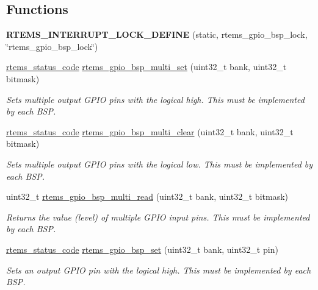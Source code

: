 \subsection*{Functions}
\begin{DoxyCompactItemize}
\item 
\mbox{\label{rpi-gpio_8c_a8cc4adc10f9d16b85b524f1ad1151929}} 
{\bfseries R\+T\+E\+M\+S\+\_\+\+I\+N\+T\+E\+R\+R\+U\+P\+T\+\_\+\+L\+O\+C\+K\+\_\+\+D\+E\+F\+I\+NE} (static, rtems\+\_\+gpio\+\_\+bsp\+\_\+lock, \char`\"{}rtems\+\_\+gpio\+\_\+bsp\+\_\+lock\char`\"{})
\item 
\mbox{\hyperlink{group__ClassicStatus_ga545d41846817eaba6143d52ee4d9e9fe}{rtems\+\_\+status\+\_\+code}} \mbox{\hyperlink{rpi-gpio_8c_a871540588ae2d984d118671860bb2cc1}{rtems\+\_\+gpio\+\_\+bsp\+\_\+multi\+\_\+set}} (uint32\+\_\+t bank, uint32\+\_\+t bitmask)
\begin{DoxyCompactList}\small\item\em Sets multiple output G\+P\+IO pins with the logical high. This must be implemented by each B\+SP. \end{DoxyCompactList}\item 
\mbox{\hyperlink{group__ClassicStatus_ga545d41846817eaba6143d52ee4d9e9fe}{rtems\+\_\+status\+\_\+code}} \mbox{\hyperlink{rpi-gpio_8c_afa7c04d98a3c71b972a41697e1842863}{rtems\+\_\+gpio\+\_\+bsp\+\_\+multi\+\_\+clear}} (uint32\+\_\+t bank, uint32\+\_\+t bitmask)
\begin{DoxyCompactList}\small\item\em Sets multiple output G\+P\+IO pins with the logical low. This must be implemented by each B\+SP. \end{DoxyCompactList}\item 
uint32\+\_\+t \mbox{\hyperlink{rpi-gpio_8c_aafc08989c3820b4453f9dc1e9a28d165}{rtems\+\_\+gpio\+\_\+bsp\+\_\+multi\+\_\+read}} (uint32\+\_\+t bank, uint32\+\_\+t bitmask)
\begin{DoxyCompactList}\small\item\em Returns the value (level) of multiple G\+P\+IO input pins. This must be implemented by each B\+SP. \end{DoxyCompactList}\item 
\mbox{\hyperlink{group__ClassicStatus_ga545d41846817eaba6143d52ee4d9e9fe}{rtems\+\_\+status\+\_\+code}} \mbox{\hyperlink{rpi-gpio_8c_ad9278a36680d984394c55f09283fc630}{rtems\+\_\+gpio\+\_\+bsp\+\_\+set}} (uint32\+\_\+t bank, uint32\+\_\+t pin)
\begin{DoxyCompactList}\small\item\em Sets an output G\+P\+IO pin with the logical high. This must be implemented by each B\+SP. \end{DoxyCompactList}\item 

\end{DoxyCompactItemize}
